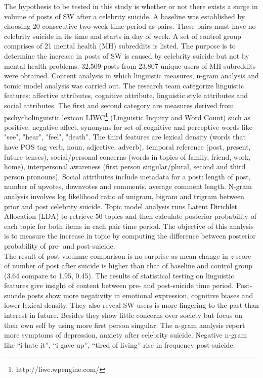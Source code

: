The hypothesis to be tested in this study is whether or not there exists a surge in volume of posts of SW after a celebrity suicide. A baseline was established by choosing 20 consecutive two-week time period as pairs. These pairs must have no celebrity suicide in its time and starts in day of week. A set of control group comprises of 21 mental health (MH) subreddits is listed. The purpose is to determine the increase in posts of SW is caused by celebrity suicide but not by mental health problems. 32,509 posts from 23,807 unique users of MH subreddits were obtained. Content analysis in which linguistic measures, n-gram analysis and tomic model analysis was carried out. The research team categorize linguistic features: affective attributes, cognitive attribute, linguistic style attributes and social attributes. The first and second category are measures derived from pschycholinguistic lexicon LIWC\footnote{http://liwc.wpengine.com/} (Linguistic Inquiry and Word Count) such as positive, negative affect, synonyms for set of cognitive and perceptive words like "see", "hear", "feel", "death". The third features are lexical density (words that have POS tag verb, noun, adjective, adverb), temporal reference (post, present, future tenses), social/personal concerns (words in topics of family, friend, work, home), interpersonal awareness (first person singular/plural, second and third person pronouns). Social attributes include metadata for a post: length of post, number of upvotes, downvotes and comments, average comment length. N-gram analysis involves log likelihood ratio of unigram, bigram and trigram between prior and post celebrity suicide. Topic model analysis runs Latent Dirichlet Allocation (LDA) \cite{Blei2003} to retrieve 50 topics and then calculate posterior probability of each topic for both items in each pair time period. The objective of this analysis is to measure the increase in topic by computing the difference between posterior probability of pre- and post-suicide.\\
The result of post volumne comparison is no surprise as mean change in \textit{z}-score of number of post after suicide is higher than that of baseline and control group (3.64 compare to 1.95, 0.45). The results of statistical testing on linguistic features give insight of content between pre- and post-suicide time period. Post-suicide posts show more negativity in emotional expression, cognitive biases and lower lexical density. They also reveal SW users is more lingering to the past than interest in future. Besides they show little concerns over society but focus on their own self by using more first person singular. The n-gram analysis report more symptoms of depression, anxiety after celebrity suicide. Negative n-gram like “i hate it”, “i gave up”, “tired of living” rise in frequency post-suicide. \\
